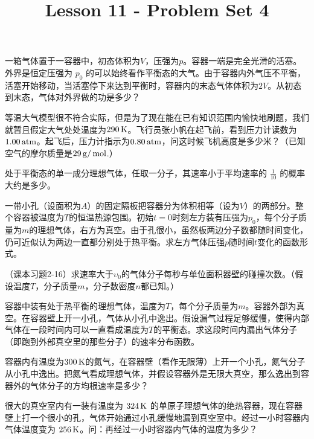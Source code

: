 \documentclass[CJK]{beamer}
\title{Lesson 11 - Problem Set 4}
\author{}
\date{}
\begin{document}


\begin{frame}
  \bchL
一箱气体置于一容器中，初态体积为$V$，压强为$p$。容器一端是完全光滑的活塞。外界是恒定压强为 $p_0$ 的可以始终看作平衡态的大气。由于容器内外气压不平衡，活塞开始移动，当活塞停下来达到平衡时，容器内的末态气体体积为$2V$。从初态到末态，气体对外界做的功是多少？
  \echL
\end{frame}


\begin{frame}
  \bchL
等温大气模型很不符合实际，但是为了现在能在已有知识范围内愉快地刷题，我们就暂且假定大气处处温度为$290\,\mathrm{K}$。飞行员张小帆在起飞前，看到压力计读数为$1.00\,\mathrm{atm}$。起飞后，压力计指示为$0.80\,\mathrm{atm}$，问这时候飞机高度是多少米？（已知空气的摩尔质量是$29\,\mathrm{g}/\,\mathrm{mol}$.）
  \echL
\end{frame}

\begin{frame}
  \bchL
处于平衡态的单一成分理想气体，任取一分子，其速率小于平均速率的 $\frac{1}{10}$ 的概率大约是多少。
  \echL
\end{frame}


\begin{frame}
  \bchL
一带小孔（设面积为$A$）的固定隔板把容器分为体积相等（设为$V$）的两部分。整个容器被温度为$T$的恒温热源包围。初始$t=0$时刻左方装有压强为$p_0$，每个分子质量为$m$的理想气体，右方为真空。由于孔很小，虽然板两边分子数都随时间变化，仍可近似认为两边一直都分别处于热平衡。求左方气体压强$p$随时间$t$变化的函数形式。
  \echL
\end{frame}

\begin{frame}
  \bchL
  （课本习题2-16）求速率大于$\upsilon_0$的气体分子每秒与单位面积器壁的碰撞次数。（假设温度$T$，分子质量$m$，分子数密度$n$都已知。）
  \echL
\end{frame}


\begin{frame}
  \bchL
容器中装有处于热平衡的理想气体，温度为$T$，每个分子质量为$m$。容器外部为真空。在容器壁上开一小孔，气体从小孔中逸出。假设漏气过程足够缓慢，使得内部气体在一段时间内可以一直看成温度为$T$的平衡态。求这段时间内漏出气体分子（即跑到外部真空里的那些分子）的速率分布函数。  
  \echL
\end{frame}


\begin{frame}
  \bchL
容器内有温度为$300\,\mathrm{K}$的氮气，在容器壁（看作无限薄）上开一个小孔，氮气分子从小孔中逸出。把氮气看成理想气体，并假设容器外是无限大真空，那么逸出到容器外的气体分子的方均根速率是多少？
\echL
\end{frame}


\begin{frame}
  \bchL
很大的真空室内有一装有温度为 $324\,\mathrm{K}$ 的单原子理想气体的绝热容器，现在容器壁上打一个很小的孔，气体开始通过小孔缓慢地漏到真空室中。经过一小时容器内气体温度变为 $256\,\mathrm{K}$。问：再经过一小时容器内气体的温度为多少？
  \echL
\end{frame}
\end{document}
